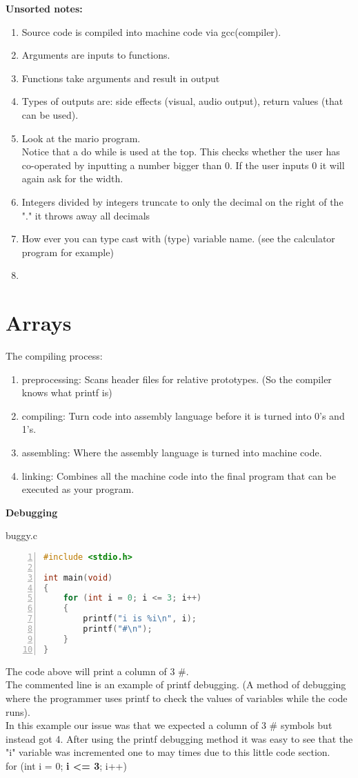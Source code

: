 \documentclass[12pt, letterpaper]{report}
\begin{document}
\textbf{Unsorted notes:}
\begin{enumerate}
	\item Source code is compiled into machine code via gcc(compiler).
	\item Arguments are inputs to functions.
	\item Functions take arguments and result in output
	\item Types of outputs are: side effects (visual, audio output), return values (that can be used).
	\item Look at the mario program. \\
		Notice that a do while is used at the top. This checks whether the user has co-operated by inputting a number bigger than 0. If the user inputs 0 it will again ask for the width.
	\item Integers divided by integers truncate to only the decimal on the right of the "." it throws away all decimals
	\item How ever you can type cast with (type) variable name. (see the calculator program for example)
	\item 
\end{enumerate}

\chapter{Arrays}

The compiling process:

\begin{enumerate}
	\item preprocessing: Scans header files for relative prototypes. (So the compiler knows what printf is)
	\item compiling: Turn code into assembly language before it is turned into 0's and 1's.
	\item assembling: Where the assembly language is turned into machine code.
	\item linking: Combines all the machine code into the final program that can be executed as your program.
\end{enumerate}

\textbf{Debugging}

buggy.c
\begin{lstlisting}[language=C,numbers=left,framexleftmargin=5mm,frame=single,xleftmargin=18pt]
#include <stdio.h>

int main(void)
{
	for (int i = 0; i <= 3; i++)
	{
		printf("i is %i\n", i);
		printf("#\n");
	}
}
\end{lstlisting}
The code above will print a column of 3 \#.\\
The commented line is an example of printf debugging. (A method of debugging where the programmer uses printf to check the values of variables while the code runs).\\
In this example our issue was that we expected a column of 3 \# symbols but instead got 4. After using the printf debugging method it was easy to see that the "i" variable 
was incremented one to may times due to this little code section. \\
for (int i = 0; \textbf{i <= 3}; i++)
\end{document}
